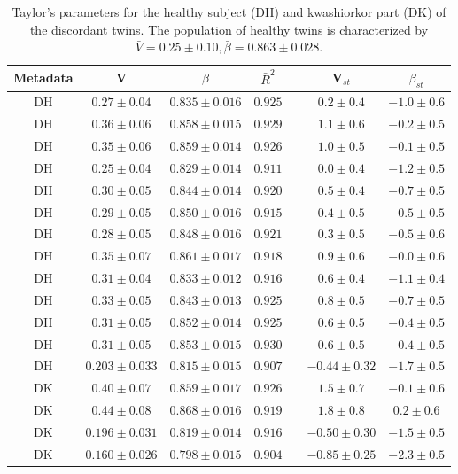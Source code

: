 \documentclass[12pt,oneside,letterpaper]{article}
\begin{document}
\clearpage

\begin{table} 
\caption{Taylor's parameters for the healthy subject (DH) and kwashiorkor part (DK) of the discordant twins\cite{kwashiorkor}. The population of healthy twins is characterized by $\bar{V} = 0.25 \pm 0.10, \bar{\beta} = 0.863 \pm 0.028$.}
  \begin{center}
    \begin{tabular}{*{7}{c}}
	    \hline
		Metadata&V&$\beta$&$\bar{R}^2$&&V$_{st}$&$\beta_{st}$\\
		\hline
		DH&$0.27 \pm 0.04$&$0.835 \pm 0.016$&$0.925$&&$0.2 \pm 0.4$&$-1.0 \pm 0.6$\\
		DH&$0.36 \pm 0.06$&$0.858 \pm 0.015$&$0.929$&&$1.1 \pm 0.6$&$-0.2 \pm 0.5$\\
		DH&$0.35 \pm 0.06$&$0.859 \pm 0.014$&$0.926$&&$1.0 \pm 0.5$&$-0.1 \pm 0.5$\\
		DH&$0.25 \pm 0.04$&$0.829 \pm 0.014$&$0.911$&&$0.0 \pm 0.4$&$-1.2 \pm 0.5$\\
		DH&$0.30 \pm 0.05$&$0.844 \pm 0.014$&$0.920$&&$0.5 \pm 0.4$&$-0.7 \pm 0.5$\\
		DH&$0.29 \pm 0.05$&$0.850 \pm 0.016$&$0.915$&&$0.4 \pm 0.5$&$-0.5 \pm 0.5$\\
		DH&$0.28 \pm 0.05$&$0.848 \pm 0.016$&$0.921$&&$0.3 \pm 0.5$&$-0.5 \pm 0.6$\\
		DH&$0.35 \pm 0.07$&$0.861 \pm 0.017$&$0.918$&&$0.9 \pm 0.6$&$-0.0 \pm 0.6$\\
		DH&$0.31 \pm 0.04$&$0.833 \pm 0.012$&$0.916$&&$0.6 \pm 0.4$&$-1.1 \pm 0.4$\\
		DH&$0.33 \pm 0.05$&$0.843 \pm 0.013$&$0.925$&&$0.8 \pm 0.5$&$-0.7 \pm 0.5$\\
		DH&$0.31 \pm 0.05$&$0.852 \pm 0.014$&$0.925$&&$0.6 \pm 0.5$&$-0.4 \pm 0.5$\\
		DH&$0.31 \pm 0.05$&$0.853 \pm 0.015$&$0.930$&&$0.6 \pm 0.5$&$-0.4 \pm 0.5$\\
		DH&$0.203 \pm 0.033$&$0.815 \pm 0.015$&$0.907$&&$-0.44 \pm 0.32$&$-1.7 \pm 0.5$\\
		\hline
		DK&$0.40 \pm 0.07$&$0.859 \pm 0.017$&$0.926$&&$1.5 \pm 0.7$&$-0.1 \pm 0.6$\\
		DK&$0.44 \pm 0.08$&$0.868 \pm 0.016$&$0.919$&&$1.8 \pm 0.8$&$0.2 \pm 0.6$\\
		DK&$0.196 \pm 0.031$&$0.819 \pm 0.014$&$0.916$&&$-0.50 \pm 0.30$&$-1.5 \pm 0.5$\\
		DK&$0.160 \pm 0.026$&$0.798 \pm 0.015$&$0.904$&&$-0.85 \pm 0.25$&$-2.3 \pm 0.5$\\

\end{tabular}
\end{center}
\end{table}
\end{document}
